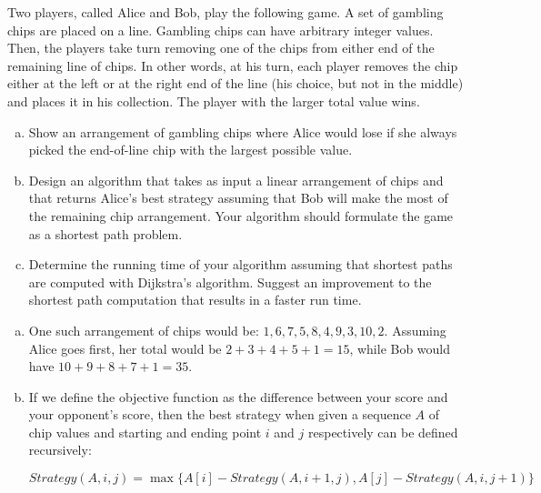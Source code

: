 \documentclass[fleqn]{homework}
\begin{document}
  \begin{problem}{5}
    \begin{question}
      Two players, called Alice and Bob, play the following game. A set of
      gambling chips are placed on a line. Gambling chips can have arbitrary
      integer values. Then, the players take turn removing one of the chips from
      either end of the remaining line of chips. In other words, at his turn,
      each player removes the chip either at the left or at the right end of the
      line (his choice, but not in the middle) and places it in his collection.
      The player with the larger total value wins.

      \begin{enumerate}[a.]
      \item Show an arrangement of gambling chips where Alice would lose if she
        always picked the end-of-line chip with the largest possible value.
      \item Design an algorithm that takes as input a linear arrangement of
        chips and that returns Alice's best strategy assuming that Bob will make
        the most of the remaining chip arrangement. Your algorithm should
        formulate the game as a shortest path problem.  
      \item Determine the running time of your algorithm assuming that shortest
        paths are computed with Dijkstra's algorithm. Suggest an improvement to
        the shortest path computation that results in a faster run time.
      \end{enumerate}
    \end{question}

    \begin{enumerate}[a.]
    \item One such arrangement of chips would be:
      $1, 6, 7, 5, 8, 4, 9, 3, 10, 2$.  Assuming Alice goes first, her total
      would be $2 + 3 + 4 + 5 + 1 = 15$, while Bob would have
      $10 + 9 + 8 + 7 + 1 = 35$.
    \item If we define the objective function as the difference between your
      score and your opponent's score, then the best strategy when given a
      sequence $A$ of chip values and starting and ending point $i$ and $j$
      respectively can be defined recursively:

      \begin{equation*}
        Strategy(A,i,j) = \max \{A[i] - Strategy(A,i+1,j), A[j] - Strategy(A,i,j+1)\}
      \end{equation*}


\end{enumerate}
\end{problem}
\end{document}
